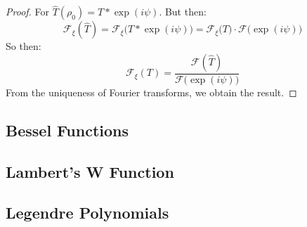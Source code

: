         \begin{proof}
            For $\hat{T}(\rho_{0})=T*\exp(i\psi)$. But then:
            \begin{equation}
                \mathcal{F}_{\xi}(\hat{T})
                =\mathcal{F}_{\xi}\big(T*\exp(i\psi)\big)
                =\mathcal{F}_{\xi}\big(T\big)\cdot
                \mathcal{F}\big(\exp(i\psi)\big)
            \end{equation}
            So then:
            \begin{equation}
                \mathcal{F}_{\xi}(T)
                =\frac{\mathcal{F}(\hat{T})}
                    {\mathcal{F}\big(\exp(i\psi)\big)}
            \end{equation}
            From the uniqueness of Fourier transforms, we
            obtain the result.
        \end{proof}
    \subsection{Bessel Functions}
    \subsection{Lambert's W Function}
    \subsection{Legendre Polynomials}
